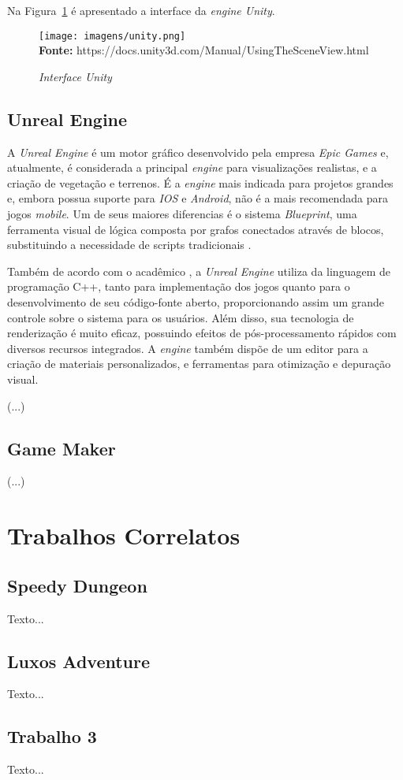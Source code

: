 Na Figura~\ref{fig:unity} é apresentado a interface da \textit{engine Unity}.

\FloatBarrier 
\begin{figure}[!htbp]
	\centering
	\caption{\textit{Interface Unity}}
	\texttt{[image: imagens/unity.png]}
	\\\textbf{Fonte:} https://docs.unity3d.com/Manual/UsingTheSceneView.html 
	\label{fig:unity}
\end{figure}
\FloatBarrier



\subsection{Unreal Engine}

A \textit{Unreal Engine} é um motor gráfico desenvolvido pela empresa \textit{Epic Games} e, atualmente, é considerada a principal \textit{engine} para visualizações realistas, e a criação de vegetação e terrenos. É a \textit{engine} mais indicada para projetos grandes e, embora possua suporte para \textit{IOS} e \textit{Android}, não é a mais recomendada para jogos \textit{mobile}. Um de seus maiores diferencias é o sistema \textit{Blueprint}, uma ferramenta visual de lógica composta por grafos conectados através de blocos, substituindo a necessidade de scripts tradicionais \cite{Smid2017}.

Também de acordo com o acadêmico , a \textit{Unreal Engine} utiliza da linguagem de programação C++, tanto para implementação dos jogos quanto para o desenvolvimento de seu código-fonte aberto, proporcionando assim um grande controle sobre o sistema para os usuários. Além disso, sua tecnologia de renderização é muito eficaz, possuindo efeitos de pós-processamento rápidos com diversos recursos integrados. A \textit{engine} também dispõe de um editor para a criação de  materiais personalizados, e ferramentas para otimização e depuração visual.

(...)

\subsection{Game Maker}	

(...)


\section{Trabalhos Correlatos}

\subsection{Speedy Dungeon}

Texto...

\subsection{Luxos Adventure}

Texto...

\subsection{Trabalho 3}

Texto...
